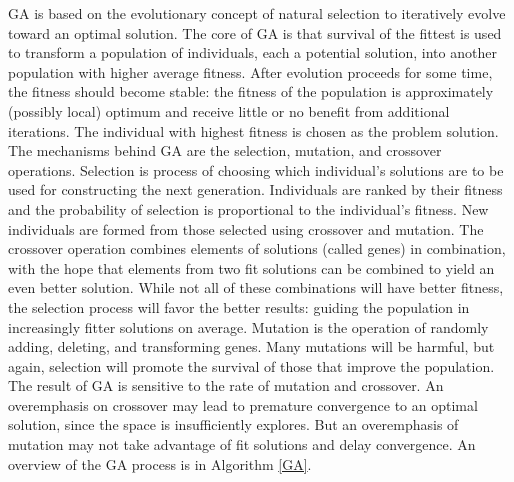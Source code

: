 \documentclass{tamuccthesis}
\begin{document}
GA is based on the evolutionary concept of natural selection to iteratively evolve toward an optimal solution. The core of GA is that survival of the fittest is used to transform a population of individuals, each a potential solution, into another population with higher average fitness. After evolution proceeds for some time, the fitness should become stable: the fitness of the population is approximately (possibly local) optimum and receive little or no benefit from additional iterations. The individual with highest fitness is chosen as the problem solution. The mechanisms behind GA are the selection, mutation, and crossover operations. Selection is process of choosing which individual's solutions are to be used for constructing the next generation. Individuals are ranked by their fitness and the probability of selection is proportional to the individual's fitness. New individuals are formed from those selected using crossover and mutation. The crossover operation combines elements of solutions (called genes) in combination, with the hope that elements from two fit solutions can be combined to yield an even better solution. While not all of these combinations will have better fitness, the selection process will favor the better results: guiding the population in increasingly fitter solutions on average. Mutation is the operation of randomly adding, deleting, and transforming genes. Many mutations will be harmful, but again, selection will promote the survival of those that improve the population. The result of GA is sensitive to the rate of mutation and crossover. An overemphasis on crossover may lead to premature convergence to an optimal solution, since the space is insufficiently explores. But an overemphasis of mutation may not take advantage of fit solutions and delay convergence. An overview of the GA process is in Algorithm \ref{GA}.
\end{document}
